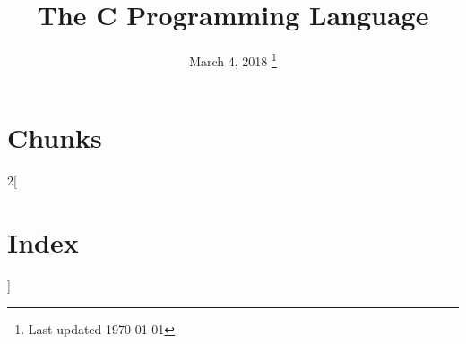 \documentclass[nobib]{tufte-book}
\title{\Huge The C Programming Language}
\date{%
  March 4, 2018
  \thanks{Last updated \today}
}
\begin{document}
\maketitle
\tableofcontents
\newpage

\newpage
\chapter*{Chunks}
\nowebchunks
\begin{multicols}{2}[\chapter*{Index}]
  \nowebindex
\end{multicols}
\end{document}

